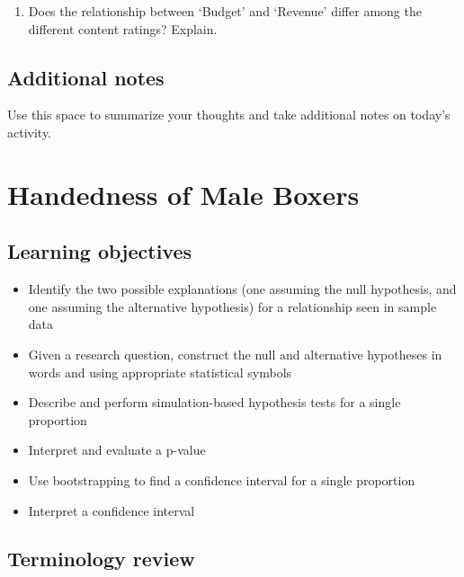 \documentclass[
]{report}
\providecommand{\tightlist}{%
  \setlength{\itemsep}{0pt}\setlength{\parskip}{0pt}}
\begin{document}
\begin{enumerate}
\def\labelenumi{\arabic{enumi}.}
\setcounter{enumi}{25}
\tightlist
\item
  Does the relationship between `Budget' and `Revenue' differ among the different content ratings? Explain.
\end{enumerate}

\vspace{1in}

\newpage

\hypertarget{additional-notes}{%
\section{Additional notes}\label{additional-notes}}

Use this space to summarize your thoughts and take additional notes on today's activity.

\hypertarget{handedness-of-male-boxers}{%
\chapter{Handedness of Male Boxers}\label{handedness-of-male-boxers}}

\hypertarget{learning-objectives}{%
\section{Learning objectives}\label{learning-objectives}}

\begin{itemize}
\item
  Identify the two possible explanations (one assuming the null hypothesis, and one assuming the alternative hypothesis) for a relationship seen in sample data
\item
  Given a research question, construct the null and alternative hypotheses
  in words and using appropriate statistical symbols
\item
  Describe and perform simulation-based hypothesis tests for a single proportion
\item
  Interpret and evaluate a p-value
\item
  Use bootstrapping to find a confidence interval for a single proportion
\item
  Interpret a confidence interval
\end{itemize}

\hypertarget{terminology-review}{%
\section{Terminology review}\label{terminology-review}}
\end{document}
